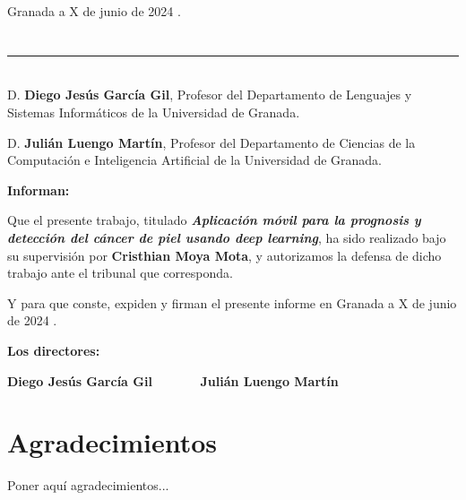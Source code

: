 \begin{flushright}
Granada a X de junio de 2024 .
\end{flushright}


\chapter*{}
\thispagestyle{empty}

\noindent\rule[-1ex]{\textwidth}{2pt}\\[4.5ex]

D. \textbf{Diego Jesús García Gil}, Profesor del Departamento de Lenguajes y Sistemas Informáticos de la Universidad de Granada.

\vspace{0.5cm}

D. \textbf{Julián Luengo Martín}, Profesor del Departamento de Ciencias de la Computación e Inteligencia Artificial
 de la Universidad de Granada.


\vspace{0.5cm}

\textbf{Informan:}

\vspace{0.5cm}

Que el presente trabajo, titulado \textit{\textbf{Aplicación móvil para la prognosis y detección del cáncer de piel usando deep learning}},
ha sido realizado bajo su supervisión por \textbf{Cristhian Moya Mota}, y autorizamos la defensa de dicho trabajo ante el tribunal
que corresponda.

\vspace{0.5cm}

Y para que conste, expiden y firman el presente informe en Granada a X de junio de 2024 .

\vspace{1cm}

\textbf{Los directores:}

\vspace{5cm}

\noindent \textbf{Diego Jesús García Gil \ \ \ \ \ \ Julián Luengo Martín}

\chapter*{Agradecimientos}
\thispagestyle{empty}

       \vspace{1cm}


Poner aquí agradecimientos...

